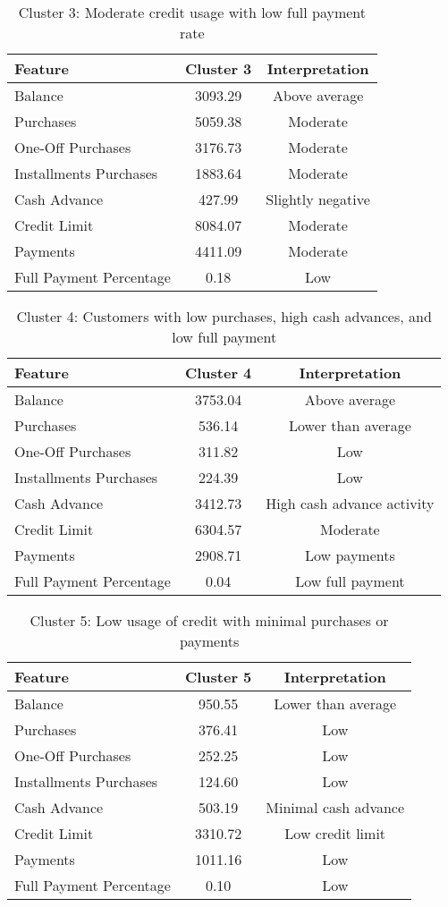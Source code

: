 \begin{table}[H]
\centering
\begin{tabular}{@{}lcc@{}}
\toprule
\textbf{Feature} & \textbf{Cluster 3} & \textbf{Interpretation} \\ \midrule
Balance & 3093.29 & Above average \\
Purchases & 5059.38 & Moderate \\
One-Off Purchases & 3176.73 & Moderate \\
Installments Purchases & 1883.64 & Moderate \\
Cash Advance & 427.99 & Slightly negative \\
Credit Limit & 8084.07 & Moderate \\
Payments & 4411.09 & Moderate \\
Full Payment Percentage & 0.18 & Low \\ \bottomrule
\end{tabular}
\caption{Cluster 3: Moderate credit usage with low full payment rate}
\end{table}

\begin{table}[H]
\centering
\begin{tabular}{@{}lcc@{}}
\toprule
\textbf{Feature} & \textbf{Cluster 4} & \textbf{Interpretation} \\ \midrule
Balance & 3753.04 & Above average \\
Purchases & 536.14 & Lower than average \\
One-Off Purchases & 311.82 & Low \\
Installments Purchases & 224.39 & Low \\
Cash Advance & 3412.73 & High cash advance activity \\
Credit Limit & 6304.57 & Moderate \\
Payments & 2908.71 & Low payments \\
Full Payment Percentage & 0.04 & Low full payment \\ \bottomrule
\end{tabular}
\caption{Cluster 4: Customers with low purchases, high cash advances, and low full payment}
\end{table}

\begin{table}[H]
\centering
\begin{tabular}{@{}lcc@{}}
\toprule
\textbf{Feature} & \textbf{Cluster 5} & \textbf{Interpretation} \\ \midrule
Balance & 950.55 & Lower than average \\
Purchases & 376.41 & Low \\
One-Off Purchases & 252.25 & Low \\
Installments Purchases & 124.60 & Low \\
Cash Advance & 503.19 & Minimal cash advance \\
Credit Limit & 3310.72 & Low credit limit \\
Payments & 1011.16 & Low \\
Full Payment Percentage & 0.10 & Low \\ \bottomrule
\end{tabular}
\caption{Cluster 5: Low usage of credit with minimal purchases or payments}
\end{table}
